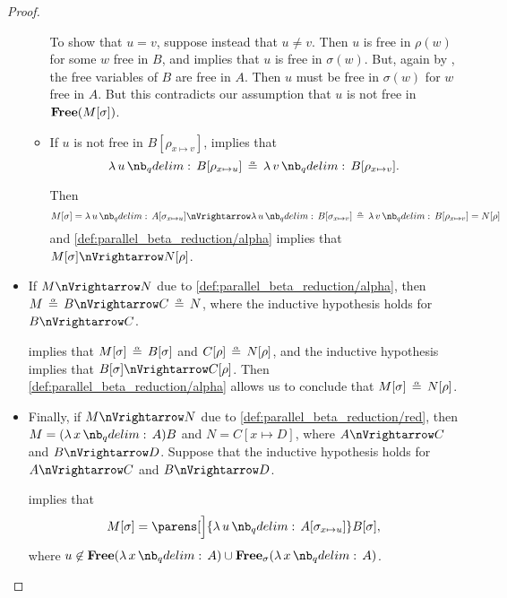 \begin{proof}
\begin{itemize}
\begin{itemize}
      To show that \( u = v \), suppose instead that \( u \neq v \). Then \( u \) is free in \( \rho(w) \) for some \( w \) free in \( B \), and  implies that \( u \) is free in \( \sigma(w) \). But, again by , the free variables of \( B \) are free in \( A \). Then \( u \) must be free in \( \sigma(w) \) for \( w \) free in \( A \). But this contradicts our assumption that \( u \) is not free in \( \op*{Free}(M[\sigma]) \).

      \item If \( u \) is not free in \( B[\rho_{x \mapsto v}] \),  implies that
      \begin{equation*}
        \qabs u B[\rho_{x \mapsto u}]
        \aequiv
        \qabs v B[\rho_{x \mapsto v}].
      \end{equation*}

      Then
      \begin{equation*}
        M[\sigma]
        =
        \qabs u A[\sigma_{x \mapsto u}]
        \pred
        \qabs u B[\sigma_{x \mapsto v}]
        \aequiv
        \qabs v B[\rho_{x \mapsto v}]
        =
        N[\rho]
      \end{equation*}
      and \ref{def:parallel_beta_reduction/alpha} implies that \( M[\sigma] \pred N[\rho] \).
    \end{itemize}

    \item If \( M \pred N \) due to \ref{def:parallel_beta_reduction/alpha}, then \( M \aequiv B \pred C \aequiv N \), where the inductive hypothesis holds for \( B \pred C \).

     implies that \( M[\sigma] \aequiv B[\sigma] \) and \( C[\rho] \aequiv N[\rho] \), and the inductive hypothesis implies that \( B[\sigma] \pred C[\rho] \). Then \ref{def:parallel_beta_reduction/alpha} allows us to conclude that \( M[\sigma] \aequiv N[\rho] \).

    \item Finally, if \( M \pred N \) due to \ref{def:parallel_beta_reduction/red}, then \( M = (\qabs x A)B \) and \( N = C[x \mapsto D] \), where \( A \pred C \) and \( B \pred D \). Suppose that the inductive hypothesis holds for \( A \pred C \) and \( B \pred D \).

     implies that
    \begin{equation*}
      M[\sigma] = \parens[\Big]{ \qabs u A[\sigma_{x \mapsto u}] } B[\sigma],
    \end{equation*}
    where \( u \not\in \op*{Free}(\qabs x A) \cup \op*{Free}_\sigma(\qabs x A) \).


\end{itemize}
\end{proof}
